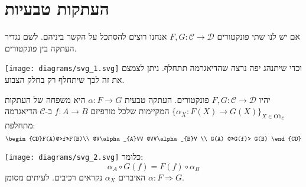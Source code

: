 \documentclass{tstextbook}
\begin{document}
\section{העתקות טבעיות}

אם יש לנו שתי פונקטורים \(F,G:\mathcal{C}\to \mathcal{D}\) אנחנו רוצים להסתכל על הקשר ביניהם. לשם נגדיר העתקה בין פונקטורים.

\texttt{[image: diagrams/svg\_1.svg]}
וכדי שיתנהג יפה נרצה שהדיאגרמה תתחלף. ניתן לצמצם את זה לכך שיתחלף רק בחלק הצבוע.

\begin{definition}
יהיו \(F,G:\mathcal{C}\to \mathcal{D}\) פונקטורים. העתקה טבעית \(\alpha:F\to G\)  היא משפחה של העתקות \(\{ \alpha_{X}:F(X)\to G(X) \}_{X \in \mathrm{Ob}_{\mathcal{C}}}\) המקיימות שלכל מורפיזם \(f:A\to B\) ב-\(\mathcal{C}\) הדיאגרמה מתחלפת:
$$\begin{CD}F(A)@>f>>F(B)\\ @V\alpha_{A}VV @VV\alpha_{B}V \\ G(A) @>>G(f)> G(B) \end{CD}$$

\end{definition}
\texttt{[image: diagrams/svg\_2.svg]}
כלומר:
$$\alpha_{A}\circ  G(f)=F(f)\circ  \alpha_{B}$$
האיברים \(\alpha_{X}\) נקראים רכיבים. לעיתים מסומן \(\alpha:F\Rightarrow G\).
\end{document}
